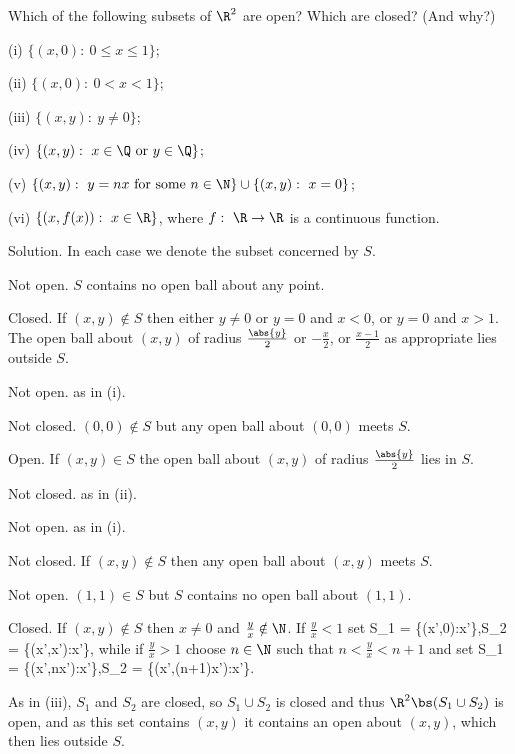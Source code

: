 \een

\begin{exercise}
Which of the following subsets of $\R^2$ are open? Which are closed? (And why?)
\ben
\item [(i)] $\{(x, 0) :\ 0 \leq x \leq 1\}$;
\item [(ii)] $\{(x, 0) :\ 0 < x < 1\}$;
\item [(iii)] $\{(x, y) :\ y \neq 0 \}$;
\item [(iv)] $\{(x, y) :\ x \in \Q \text{ or }y \in \Q\}$;
\item [(v)] $\{(x, y) :\ y = nx \text{ for some }n \in \N \} \cup \{(x, y) :\ x = 0\}$;
\item [(vi)] $\{(x, f(x)) :\ x \in \R\}$, where $f :\ \R \to \R$ is a continuous function.
\een
\end{exercise}

Solution. In each case we denote the subset concerned by $S$.
\ben
\item [(i)] Not open. $S$ contains no open ball about any point. 

Closed. If $(x,y)\notin S$ then either $y\neq 0$ or $y=0$ and $x<0$, or $y=0$ and $x>1$. The open ball about $(x,y)$ of radius $\frac {\abs{y}}2$ or $-\frac x2$, or $\frac{x-1}2$ as appropriate lies outside $S$.

\item [(ii)] Not open. as in (i). 

Not closed. $(0,0)\notin S$ but any open ball about $(0,0)$ meets $S$.

\item [(iii)] Open. If $(x,y)\in S$ the open ball about $(x,y)$ of radius $\frac{\abs{y}}2$ lies in $S$.

Not closed. as in (ii).

\item [(iv)] Not open. as in (i).

Not closed. If $(x,y)\notin S$ then any open ball about $(x,y)$ meets $S$.

\item [(v)] Not open. $(1,1)\in S$ but $S$ contains no open ball about $(1,1)$.

Closed. If $(x,y)\notin S$ then $x\neq 0$ and $\frac yx \notin \N$. If $\frac yx <1$ set
\be
S_1 = \{(x',0):x'\in \R\},\quad\quad S_2 = \{(x',x'):x'\in \R\},
\ee
while if $\frac yx >1$ choose $n\in\N$ such that $n< \frac yx < n+1$ and set
\be
S_1 = \{(x',nx'):x'\in \R\},\quad\quad S_2 = \{(x',(n+1)x'):x'\in \R\}.
\ee

As in (iii), $S_1$ and $S_2$ are closed, so $S_1\cup S_2$ is closed and thus $\R^2\bs (S_1\cup S_2)$ is open, and as this set contains $(x,y)$ it contains an open about $(x,y)$, which then lies outside $S$.



